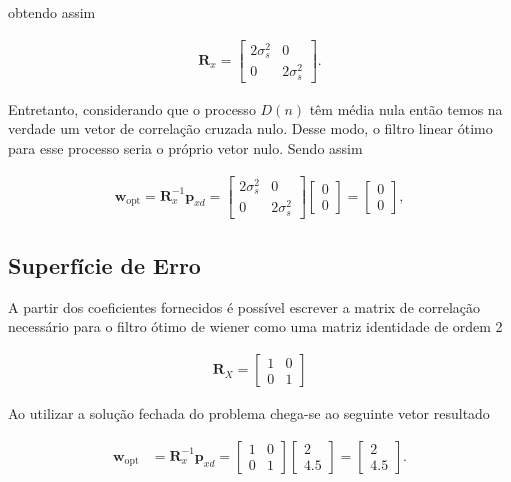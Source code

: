 obtendo assim

\begin{align} 
    \mathbf{R}_{x} = 
    \begin{bmatrix}
        2 \sigma^{2}_{s} & 0 \\
        0  & 2 \sigma^{2}_{s}
    \end{bmatrix}.
\end{align}

Entretanto, considerando que o processo $D(n)$ têm média nula então temos na verdade um vetor de correlação cruzada nulo. Desse modo, o filtro linear
ótimo para esse processo seria o próprio vetor nulo. Sendo assim

\begin{align} 
    \mathbf{w}_{\text{opt}} = \mathbf{R}^{-1}_{x} \mathbf{p}_{xd} = 
    \begin{bmatrix}
        2 \sigma^{2}_{s} & 0 \\
        0  & 2 \sigma^{2}_{s}
    \end{bmatrix}
    \begin{bmatrix}
        0 \\
        0 
    \end{bmatrix} = 
    \begin{bmatrix}
        0 \\
        0 
    \end{bmatrix},  
\end{align}


\subsection{Superfície de Erro}


A partir dos coeficientes fornecidos é possível escrever a matrix de correlação necessário para o filtro ótimo de wiener como uma matriz identidade de ordem 2
						
\begin{align}
    \mathbf{R}_{X} = \left[ \begin{matrix} 1 & 0 \\ 0 & 1 \end{matrix} \right]
\end{align}

Ao utilizar a solução fechada do problema chega-se ao seguinte vetor resultado

\begin{align}
    \mathbf{w}_{\text{opt}} &= \mathbf{R}^{-1}_{x} \mathbf{p}_{xd} = \left[ \begin{matrix} 1 & 0 \\ 0 & 1 \end{matrix} \right]  \left[ \begin{matrix} 2 \\ 4.5 \end{matrix} \right] = \left[ \begin{matrix} 2 \\ 4.5 \end{matrix} \right].
\end{align}

